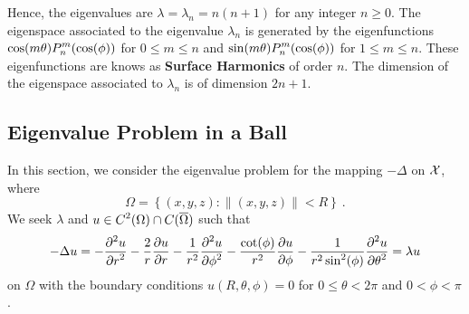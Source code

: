Hence, the eigenvalues are
$\lambda = \lambda_n = n(n+1)$ for any integer $n\geq 0$.
The eigenspace associated to the eigenvalue $\lambda_n$ is
generated by the eigenfunctions
$\displaystyle \cos(m\theta)P_n^m(\cos(\phi))$ for $0 \leq m \leq n$
and
$\displaystyle \sin(m\theta)P_n^m(\cos(\phi))$ for $1 \leq m \leq n$.
These eigenfunctions are knows as
{\bfseries Surface Harmonics} of
order $n$.  The dimension of the eigenspace associated to $\lambda_n$
is of dimension $2n+1$.

\subsection{Eigenvalue Problem in a Ball}

In this section, we consider the eigenvalue problem for the mapping
$-\Delta$ on $\cal X$, where
\[
  \Omega = \left\{ (x,y,z) :  \|(x,y,z)\| < R \right\} \ .
\]
We seek $\lambda$ and
$\displaystyle u \in C^2(\Omega)\cap C(\overline{\Omega})$ such that
\begin{equation} \label{laplace_e_eigenB}
-\Delta u = -\frac{\displaystyle \partial^{2}{u}} {\displaystyle \partial r^{2}} - \frac{2}{r} \frac{\partial{u}}{\partial r}
- \frac{1}{r^2} \frac{\displaystyle \partial^{2}{u}} {\displaystyle \partial \phi^{2}} - \frac{\cot(\phi)}{r^2}
\frac{\partial{u}}{\partial \phi} - \frac{1}{r^2\sin^2(\phi)}\frac{\displaystyle \partial^{2}{u}} {\displaystyle \partial \theta^{2}} 
= \lambda u
\end{equation}
on $\Omega$ with the boundary conditions $u(R,\theta, \phi) =0$ for
$0\leq \theta < 2\pi$ and $0<\phi<\pi$.

